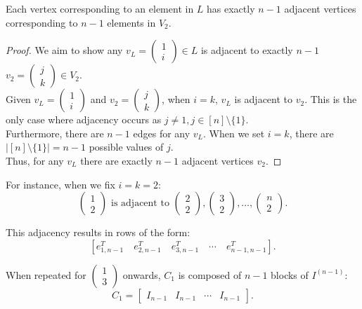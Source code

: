 \begin{proposition}
    Each vertex corresponding to an element in \(L\) has exactly \( n-1 \) adjacent vertices corresponding to \(n-1\) elements in \(V_2\).
\end{proposition}
\begin{proof}
    We aim to show any \(v_L = \begin{pmatrix}1\\i\end{pmatrix} \in L\) is adjacent to exactly \(n-1\) \(v_2 = \begin{pmatrix}j\\k\end{pmatrix} \in V_2\). \\
    Given \(v_L = \begin{pmatrix}1\\i\end{pmatrix}\) and \(v_2 = \begin{pmatrix}j\\k\end{pmatrix}\), when \(i = k\), \(v_L\) is adjacent to \(v_2\). This is the only case where adjacency occurs as \(j\neq 1, j\in[n]\setminus\{1\}\). \\
    Furthermore, there are \(n-1\) edges for any \(v_L\). When we set \(i=k\), there are \(|[n]\setminus\{1\}|=n-1\) possible values of \(j\). \\
    Thus, for any \(v_L\) there are exactly \(n-1\) adjacent vertices \(v_2\).
\end{proof}
For instance, when we fix \(i=k=2\):
\[
\begin{pmatrix} 1 \\ 2 \end{pmatrix} \text{ is adjacent to } \begin{pmatrix} 2 \\ 2 \end{pmatrix}, \begin{pmatrix} 3 \\ 2 \end{pmatrix}, \dots, \begin{pmatrix} n \\ 2 \end{pmatrix}.
\]

This adjacency results in rows of the form:
\[
[e_{1,n-1}^T \quad e_{2,n-1}^T \quad e_{3,n-1}^T \quad \cdots \quad e_{n-1,n-1}^T]. 
\]

When repeated for \( \begin{pmatrix} 1 \\ 3 \end{pmatrix} \) onwards, \( C_1 \) is composed of \( n-1 \) blocks of \( I^{(n-1)} \):
\[
C_1 = 
\begin{bmatrix}
I_{n-1} & I_{n-1} & \cdots & I_{n-1}
\end{bmatrix}.
\]

